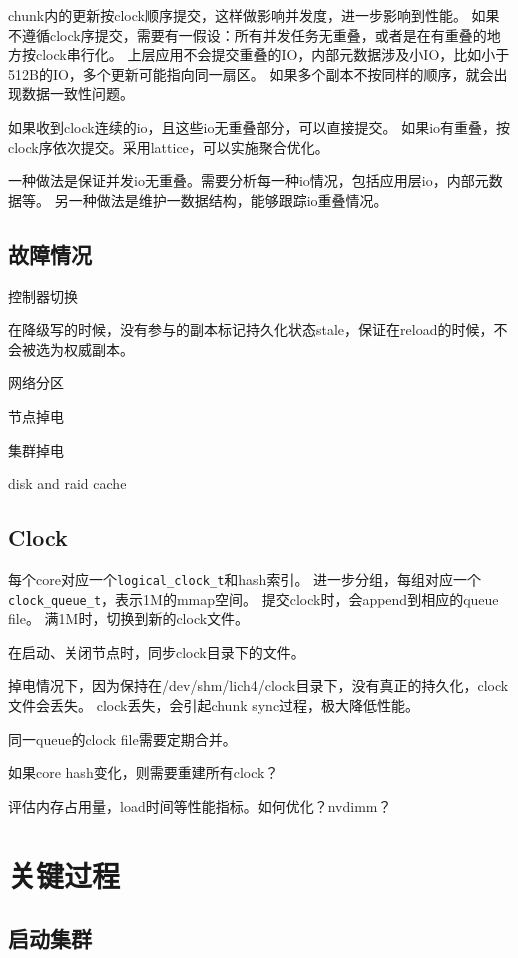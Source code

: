 chunk内的更新按clock顺序提交，这样做影响并发度，进一步影响到性能。
如果不遵循clock序提交，需要有一假设：所有并发任务无重叠，或者是在有重叠的地方按clock串行化。
上层应用不会提交重叠的IO，内部元数据涉及小IO，比如小于512B的IO，多个更新可能指向同一扇区。
如果多个副本不按同样的顺序，就会出现数据一致性问题。

如果收到clock连续的io，且这些io无重叠部分，可以直接提交。
如果io有重叠，按clock序依次提交。采用lattice，可以实施聚合优化。

一种做法是保证并发io无重叠。需要分析每一种io情况，包括应用层io，内部元数据等。
另一种做法是维护一数据结构，能够跟踪io重叠情况。

\subsection{故障情况}

控制器切换

在降级写的时候，没有参与的副本标记持久化状态stale，保证在reload的时候，不会被选为权威副本。

网络分区

节点掉电

集群掉电

disk and raid cache

\subsection{Clock}

每个core对应一个\verb|logical_clock_t|和hash索引。
进一步分组，每组对应一个\verb|clock_queue_t|，表示1M的mmap空间。
提交clock时，会append到相应的queue file。
满1M时，切换到新的clock文件。

在启动、关闭节点时，同步clock目录下的文件。

掉电情况下，因为保持在/dev/shm/lich4/clock目录下，没有真正的持久化，clock文件会丢失。
clock丢失，会引起chunk sync过程，极大降低性能。

同一queue的clock file需要定期合并。

如果core hash变化，则需要重建所有clock？

评估内存占用量，load时间等性能指标。如何优化？nvdimm？

\section{关键过程}

\subsection{启动集群}

